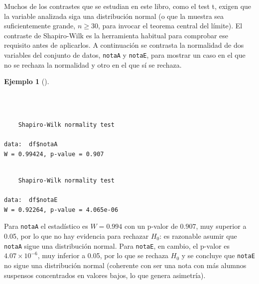 \documentclass[
  spanish,
  a4paper,
]{scrreport}
\newenvironment{Shaded}{\begin{snugshade}}{\end{snugshade}}
\newcommand{\FunctionTok}[1]{\textcolor[rgb]{0.28,0.35,0.67}{#1}}
\newcommand{\NormalTok}[1]{\textcolor[rgb]{0.00,0.23,0.31}{#1}}
\newcommand{\SpecialCharTok}[1]{\textcolor[rgb]{0.37,0.37,0.37}{#1}}
\theoremstyle{definition}
\newtheorem{example}{Ejemplo}[chapter]
\theoremstyle{definition}
\theoremstyle{remark}
\begin{document}
Muchos de los contrastes que se estudian en este libro, como el test t,
exigen que la variable analizada siga una distribución normal (o que la
muestra sea suficientemente grande, \(n \geq 30\), para invocar el
teorema central del límite). El contraste de Shapiro-Wilk es la
herramienta habitual para comprobar ese requisito antes de aplicarlos. A
continuación se contrasta la normalidad de dos variables del conjunto de
datos, \texttt{notaA} y \texttt{notaE}, para mostrar un caso en el que
no se rechaza la normalidad y otro en el que sí se rechaza.

\begin{example}[]\protect\hypertarget{exm-unapoblacion-shapiro-wilk}{}\label{exm-unapoblacion-shapiro-wilk}

~

\begin{Shaded}
\end{Shaded}

\begin{verbatim}

    Shapiro-Wilk normality test

data:  df$notaA
W = 0.99424, p-value = 0.907
\end{verbatim}

\begin{Shaded}
\end{Shaded}

\begin{verbatim}

    Shapiro-Wilk normality test

data:  df$notaE
W = 0.92264, p-value = 4.065e-06
\end{verbatim}

Para \texttt{notaA} el estadístico es \(W=0.994\) con un p-valor de
\(0.907\), muy superior a 0.05, por lo que no hay evidencia para
rechazar \(H_0\): es razonable asumir que \texttt{notaA} sigue una
distribución normal. Para \texttt{notaE}, en cambio, el p-valor es
\(4.07\times10^{-6}\), muy inferior a 0.05, por lo que se rechaza
\(H_0\) y se concluye que \texttt{notaE} no sigue una distribución
normal (coherente con ser una nota con más alumnos suspensos
concentrados en valores bajos, lo que genera asimetría).

\end{example}
\end{document}
